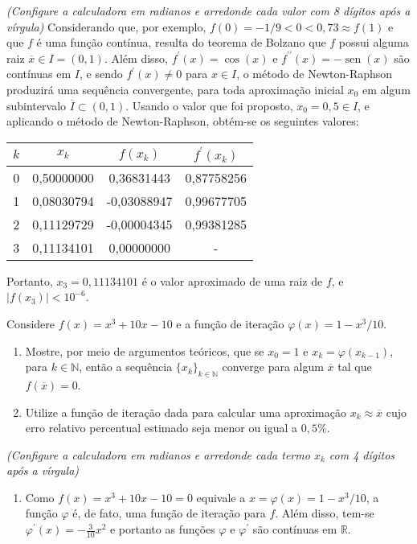 \documentclass[12pt,a4paper]{article}
\newcommand*\sen{\operatorname{sen}}
\newcommand*\R{\mathbb{R}}
\begin{document}
\begin{ExerciseList}
\textit{(Configure a calculadora em radianos e arredonde cada valor com 8 dígitos após a vírgula)}
\Answer
Considerando que, por exemplo, $f(0) = -1/9 < 0 < 0,73 \approx f(1)$ e que $f$ é uma função contínua, resulta do teorema de Bolzano que $f$ possui alguma raiz $\overline{x} \in I = (0, 1)$. Além disso, $f^\prime(x) = \cos(x)$ e $f^{\prime\prime}(x) = -\sen(x)$ são contínuas em $I$, e sendo $f^\prime(x) \neq 0$ para $x \in I$, o método de Newton-Raphson produzirá uma sequência convergente, para toda aproximação inicial $x_0$ em algum subintervalo $\overline{I} \subset (0, 1)$. Usando o valor que foi proposto, $x_0 = 0,5 \in I$, e aplicando o método de Newton-Raphson, obtém-se os seguintes valores:

\begin{center}
\begin{tabular}{cccc}
\hline 
$k$ & $x_k$ & $f(x_k)$ & $f^\prime(x_k)$ \\\hline
0 & 0,50000000 &  0,36831443 & 0,87758256\\
1 & 0,08030794 & -0,03088947 & 0,99677705\\
2 & 0,11129729 & -0,00004345 & 0,99381285\\
3 & 0,11134101 &  0,00000000 & -\\\hline
\end{tabular}
\end{center}

Portanto, $x_3 = 0,11134101$ é o valor aproximado de uma raiz de $f$, e $|f(x_3)| < 10^{-6}$.


\Exercise[title={2,5}]
Considere $f(x) = x^3 + 10x - 10$ e a função de iteração $\varphi(x) = 1 - x^3/10$.
\begin{enumerate}
\item Mostre, por meio de argumentos teóricos, que se $x_0 = 1$ e $x_k = \varphi(x_{k-1})$, para $k \in \mathbb{N}$, então a sequência $\{x_k\}_{k \in \mathbb{N}}$ converge para algum $\overline{x}$ tal que $f(\overline{x}) = 0$. 
\item Utilize a função de iteração dada para calcular uma aproximação $x_k \approx \overline{x}$ cujo erro relativo percentual estimado seja menor ou igual a $0,5\%$.
\end{enumerate}
\textit{(Configure a calculadora em radianos e arredonde cada termo $x_k$ com 4 dígitos após a vírgula)}
\Answer
\begin{enumerate}
\item Como $f(x) = x^3 + 10x - 10 = 0$ equivale a $x = \varphi(x) = 1 - x^3/10$, a função $\varphi$ é, de fato, uma função de iteração para $f$. Além disso, tem-se $\varphi^\prime(x) = -\frac{3}{10}x^2$ e portanto as funções $\varphi$ e $\varphi^\prime$ são contínuas em $\R$.


\end{enumerate}
\end{ExerciseList}
\end{document}
